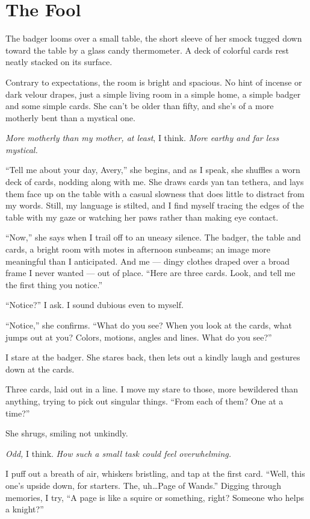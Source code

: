 \hypertarget{the-fool}{%
\chapter{The Fool}\label{the-fool}}

The badger looms over a small table, the short sleeve of her smock tugged down toward the table by a glass candy thermometer. A deck of colorful cards rest neatly stacked on its surface.

Contrary to expectations, the room is bright and spacious. No hint of incense or dark velour drapes, just a simple living room in a simple home, a simple badger and some simple cards. She can't be older than fifty, and she's of a more motherly bent than a mystical one.

\emph{More motherly than my mother, at least}, I think. \emph{More earthy and far less mystical.}

``Tell me about your day, Avery,'' she begins, and as I speak, she shuffles a worn deck of cards, nodding along with me. She draws cards yan tan tethera, and lays them face up on the table with a casual slowness that does little to distract from my words. Still, my language is stilted, and I find myself tracing the edges of the table with my gaze or watching her paws rather than making eye contact.

``Now,'' she says when I trail off to an uneasy silence. The badger, the table and cards, a bright room with motes in afternoon sunbeams; an image more meaningful than I anticipated. And me --- dingy clothes draped over a broad frame I never wanted --- out of place. ``Here are three cards. Look, and tell me the first thing you notice.''

``Notice?'' I ask. I sound dubious even to myself.

``Notice,'' she confirms. ``What do you see? When you look at the cards, what jumps out at you? Colors, motions, angles and lines. What do you see?''

I stare at the badger. She stares back, then lets out a kindly laugh and gestures down at the cards.

Three cards, laid out in a line. I move my stare to those, more bewildered than anything, trying to pick out singular things. ``From each of them? One at a time?''

She shrugs, smiling not unkindly.

\emph{Odd,} I think. \emph{How such a small task could feel overwhelming.}

I puff out a breath of air, whiskers bristling, and tap at the first card. ``Well, this one's upside down, for starters. The, uh\ldots{}Page of Wands.'' Digging through memories, I try, ``A page is like a squire or something, right? Someone who helps a knight?''

